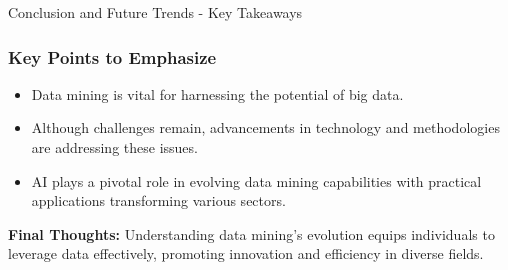 \documentclass[aspectratio=169]{beamer}
\begin{document}
\begin{frame}[fragile]{Conclusion and Future Trends - Key Takeaways}
    \frametitle{Key Points to Emphasize}
    \begin{itemize}
        \item Data mining is vital for harnessing the potential of big data.
        \item Although challenges remain, advancements in technology and methodologies are addressing these issues.
        \item AI plays a pivotal role in evolving data mining capabilities with practical applications transforming various sectors.
    \end{itemize}
    
    \textbf{Final Thoughts:} Understanding data mining's evolution equips individuals to leverage data effectively, promoting innovation and efficiency in diverse fields.
\end{frame}
\end{document}
